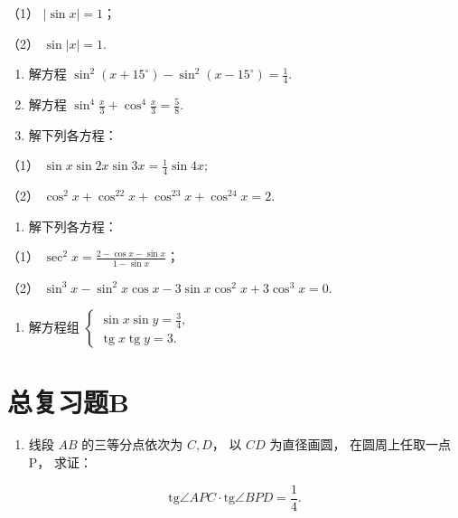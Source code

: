 （1） \(|\sin x| = 1\)；

（2） \(\sin |x| = 1\).

\begin{enumerate}[start=60]
\item
  解方程
  \(\sin^2 (x + 15^\circ) - \sin^2 (x - 15^\circ) = \frac{1}{4}\).
\item
  解方程 \(\sin^4 \frac{x}{3} + \cos^4 \frac{x}{3} = \frac{5}{8}\).
\item
  解下列各方程：
\end{enumerate}

（1） \(\sin x\sin 2x\sin 3x = \frac{1}{4}\sin 4x;\)

（2） \(\cos^2 x + \cos^22x + \cos^23x + \cos^24x = 2.\)

\begin{enumerate}[start=63]
\item
  解下列各方程：
\end{enumerate}

（1） \(\sec^2 x = \frac{2 - \cos x - \sin x}{1 - \sin x}\)；

（2）
\(\sin^3 x - \sin^2 x \cos x - 3 \sin x \cos^2 x + 3 \cos^3 x = 0\).

\begin{enumerate}[start=64]
\item
  解方程组
  \(\left\{\begin{array}{l}\sin x\sin y=\frac{3}{4},\\ \operatorname{tg} x\operatorname{tg} y=3.\end{array}\right.\)
\end{enumerate}

\chapter{总复习题B}

\begin{enumerate}
\item
  线段 \(AB\) 的三等分点依次为 \(C, D\)， 以 \(CD\) 为直径画圆，
  在圆周上任取一点 P， 求证：
\end{enumerate}

\[
\mathrm{tg} \angle A P C \cdot \mathrm{tg} \angle B P D = \frac {1}{4}.
\]

